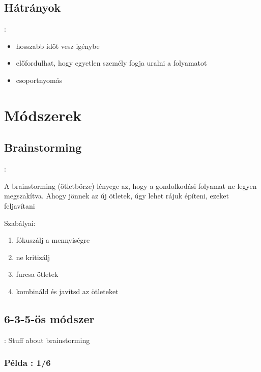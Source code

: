 \documentclass{beamer}
\begin{document}
\subsection{Hátrányok}
\begin{frame}{\secname : \subsecname}
    \begin{itemize}
        \item hosszabb időt vesz igénybe
        \item előfordulhat, hogy egyetlen személy fogja uralni a folyamatot
        \item csoportnyomás
    \end{itemize}
\end{frame}


\section{Módszerek}

\subsection{Brainstorming}
\begin{frame}{\secname : \subsecname}

A brainstorming (ötletbörze) lényege az, hogy a gondolkodási folyamat ne legyen megszakítva. Ahogy jönnek az új ötletek, úgy lehet rájuk építeni,
ezeket feljavítani

Szabályai:
\begin{enumerate}
    \item fókuszálj a mennyiségre
    \item ne kritizálj
    \item furcsa ötletek 
    \item kombináld és javítsd az ötleteket
\end{enumerate}
\end{frame}

\subsection{6-3-5-ös módszer}
\begin{frame}{\secname : \subsecname}
    Stuff about brainstorming
\end{frame}

\subsubsection{Példa : 1/6}
\begin{frame}
    
\end{frame}
\end{document}
